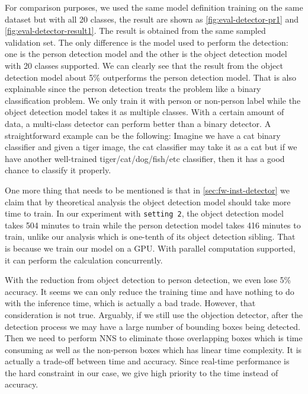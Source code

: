 For comparison purposes, we used the same model definition training on the same
dataset but with all 20 classes, the result are shown as
\autoref{fig:eval-detector-pr1} and \autoref{fig:eval-detector-result1}. The
result is obtained from the same sampled validation set. The only difference is the
model used to perform the detection: one is the person detection model and the
other is the object detection model with 20 classes supported. We can clearly
see that the result from the object detection model about 5\% outperforms the person detection model.
That is also explainable since the person detection treats the problem like a
binary classification problem. We only train it with person or non-person label
while the object detection model takes it as multiple classes. With a certain amount
of data, a multi-class detector can perform better than a binary detector.
A straightforward example can be the following: Imagine we have a cat binary classifier
and given a tiger image, the cat classifier may take it as a cat but if we have
another well-trained tiger/cat/dog/fish/etc classifier, then it has a good
chance to classify it properly.

One more thing that needs to be mentioned is that in \autoref{sec:fw-inst-detector}
we claim that by theoretical analysis the object detection model should take
more time to train. In our experiment with \texttt{setting 2},
the object detection model takes 504
minutes to train while the person detection model takes 416 minutes to train,
unlike our analysis which is one-tenth of its object detection sibling.
That is because we train our model on a GPU. With parallel computation
supported, it can perform the calculation concurrently.

With the reduction from object detection to person detection, we even lose 5\% 
accuracy. It seems we can only reduce the training time and have nothing to do 
with the inference time, which is actually a bad trade. However, that consideration is 
not true. Arguably, if we still use the objection detector, after the detection 
process we may have a large number of bounding boxes being detected. Then we 
need to perform NNS to eliminate those overlapping boxes which is time 
consuming as well as the non-person boxes which has linear time complexity. It
is actually a trade-off between time and accuracy.
Since real-time performance is the hard constraint in our case, we give high
priority to the time instead of accuracy.


